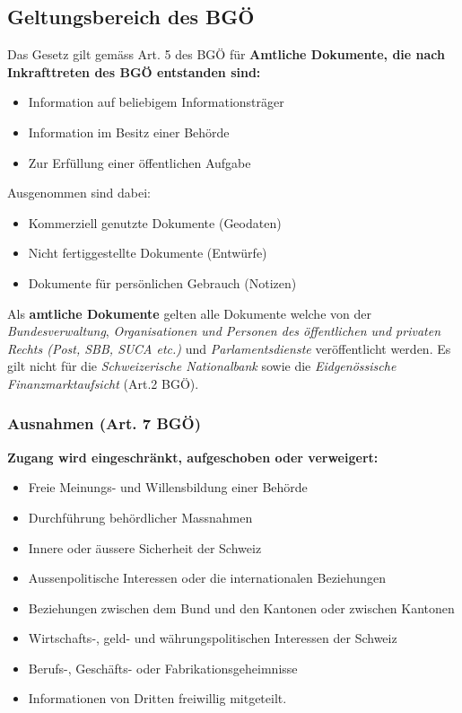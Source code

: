\subsection{Geltungsbereich des BGÖ}

Das Gesetz gilt gemäss Art. 5 des BGÖ für \textbf{Amtliche Dokumente, die nach
Inkrafttreten des BGÖ entstanden sind:}
\begin{itemize}
	\tightlist
	\item Information auf beliebigem Informationsträger
	\item Information im Besitz einer Behörde
	\item Zur Erfüllung einer öffentlichen Aufgabe
\end{itemize}

Ausgenommen sind dabei:
\begin{itemize}
	\tightlist
	\item Kommerziell genutzte Dokumente (Geodaten)
	\item Nicht fertiggestellte Dokumente (Entwürfe)
	\item Dokumente für persönlichen Gebrauch (Notizen)
\end{itemize}

Als \textbf{amtliche Dokumente} gelten alle Dokumente welche von der
\textit{Bundesverwaltung}, \textit{Organisationen und Personen des öffentlichen
und privaten Rechts (Post, SBB, SUCA etc.)} und \textit{Parlamentsdienste}
veröffentlicht werden. Es gilt nicht für die \textit{Schweizerische Nationalbank}
sowie die \textit{Eidgenössische Finanzmarktaufsicht} (Art.2 BGÖ).

\subsubsection{Ausnahmen (Art. 7 BGÖ)}
\textbf{Zugang wird eingeschränkt, aufgeschoben oder verweigert:}
\begin{itemize}
	\tightlist
	\item Freie Meinungs- und Willensbildung einer Behörde
	\item Durchführung behördlicher Massnahmen
	\item Innere oder äussere Sicherheit der Schweiz
	\item Aussenpolitische Interessen oder die internationalen Beziehungen
	\item Beziehungen zwischen dem Bund und den Kantonen oder zwischen Kantonen
	\item Wirtschafts-, geld- und währungspolitischen Interessen der Schweiz
	\item Berufs-, Geschäfts- oder Fabrikationsgeheimnisse
	\item Informationen von Dritten freiwillig mitgeteilt.
\end{itemize}

